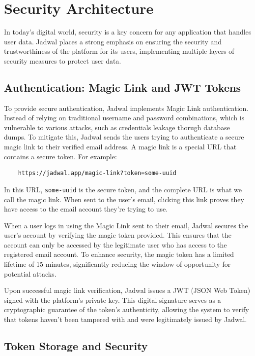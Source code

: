 \documentclass[12pt,a4paper,twoside]{report}
\begin{document}
\section{Security Architecture}

In today's digital world, security is a key concern for any application that handles user data. Jadwal places a strong emphasis on ensuring the security and trustworthiness of the platform for its users, implementing multiple layers of security measures to protect user data.

\subsection{Authentication: Magic Link and JWT Tokens}

To provide secure authentication, Jadwal implements Magic Link authentication. Instead of relying on traditional username and password combinations, which is vulnerable to various attacks, such as credentials leakage thorugh database dumps. To mitigate this, Jadwal sends the users trying to authenticate a secure magic link to their verified email address. A magic link is a special URL that contains a secure token. For example:

\begin{verbatim}
    https://jadwal.app/magic-link?token=some-uuid
\end{verbatim}

In this URL, \texttt{some-uuid} is the secure token, and the complete URL is what we call the magic link. When sent to the user's email, clicking this link proves they have access to the email account they're trying to use.

When a user logs in using the Magic Link sent to their email, Jadwal secures the user's account by verifying the magic token provided. This ensures that the account can only be accessed by the legitimate user who has access to the registered email account. To enhance security, the magic token has a limited lifetime of 15 minutes, significantly reducing the window of opportunity for potential attacks.

Upon successful magic link verification, Jadwal issues a JWT (JSON Web Token) signed with the platform's private key. This digital signature serves as a cryptographic guarantee of the token's authenticity, allowing the system to verify that tokens haven't been tampered with and were legitimately issued by Jadwal.

\subsection{Token Storage and Security}
\end{document}
